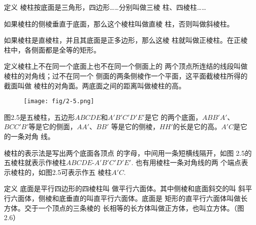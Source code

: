 \begin{blk}{定义}
    棱柱按底面是三角形，四边形……分别叫做三棱
柱、四棱柱……

如果棱柱的侧棱垂直于底面，那么这个棱柱叫做直棱
柱，否则叫做斜棱柱。

如果棱柱是直棱柱，并且其底面是正多边形，那么这棱
柱就叫做正棱柱。在正棱柱中，各侧面都是全等的矩形。
\end{blk}
 
\begin{blk}
    {定义}棱柱上不在同一个底面上也不在同一个侧面上的
两个顶点所连结的线段叫做棱柱的对角线；过不在同一个
侧面的两条侧棱作一个平面，这平面截棱柱所得的截面叫做
棱柱的对角面。两底面之间的距离叫做棱柱的高。
\end{blk}

\begin{figure}[htp]
    \centering
    \texttt{[image: fig/2-5.png]}
    \caption{}
\end{figure}

图2.5是五棱柱，五边形$ABCDE$和$A'B'C'D'E'$是它
的两个底面，$ABB'A'$、$BCC'B'$等是它的侧面，$AA'$、$BB'$
等是它的侧棱，$HH'$的长是它的高。$A'C$是它的一条对角
线。

棱柱的表示法是写出两个底面各顶点
的字母，中间用一条短横线隔开，如图
2.5的五棱柱就表示作棱柱$ABCDE$-$A'
B'C'D'E'$. 也有用棱柱一条对角线的两
个端点表示棱柱的，如图2.5可表示作五
棱柱$A'C$. 

\begin{blk}{定义} 
    底面是平行四边形的四棱柱叫
    做平行六面体。其中侧棱和底面斜交的叫
    斜平行六面体，侧棱和底垂直的叫直平行六面体。底面是
    矩形的直平行六面体叫做长方体。交于一个顶点的三条棱的
    长相等的长方体叫做正方体，也叫立方体。（图2.6）
\end{blk}

